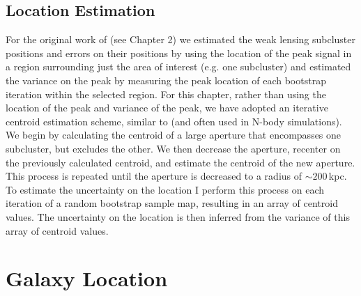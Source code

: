 \subsection{Location Estimation}\label{section:LocationEstimation}
For the original work of \citet{Dawson:2012dl} (see Chapter 2) we estimated the weak lensing subcluster positions and errors on their positions by using the location of the peak signal in a region surrounding just the area of interest (e.g. one subcluster) and estimated the variance on the peak by measuring the peak location of each bootstrap iteration within the selected region.  
For this chapter, rather than using the location of the peak and variance of the peak, we have adopted an iterative centroid estimation scheme, similar to \citet{Randall:2008hs} (and often used in N-body simulations). 
We begin by calculating the centroid of a large aperture that encompasses one subcluster, but excludes the other.
We then decrease the aperture, recenter on the previously calculated centroid, and estimate the centroid of the new aperture.
This process is repeated until the aperture is decreased to a radius of $\sim200$\,kpc.
To estimate the uncertainty on the location I perform this process on each iteration of a random bootstrap sample map, resulting in an array of centroid values.
 The uncertainty on the location is then inferred from the variance of this array of centroid values.


\section{Galaxy Location}\label{section:GalaxyLocation}

